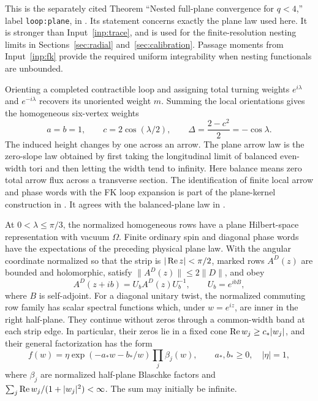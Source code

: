 This is the separately cited Theorem ``Nested full-plane convergence
for $q<4$,'' label \texttt{loop:plane}, in
\cite[Section ``From squares to the free plane law and the
sphere'']{FKCompanion}. Its statement concerns exactly the plane law
used here. It is stronger than Input~\ref{inp:trace}, and is used for
the finite-resolution nesting limits in Sections~\ref{sec:radial}
and~\ref{sec:calibration}. Passage moments from Input~\ref{inp:fk}
provide the required uniform integrability when nesting functionals
are unbounded.

Orienting a completed contractible loop and assigning total turning
weights $e^{i\lambda}$ and $e^{-i\lambda}$ recovers its unoriented
weight $m$. Summing the local orientations gives the homogeneous
six-vertex weights
\[
 a=b=1,\qquad c=2\cos(\lambda/2),\qquad
 \Delta=\frac{2-c^2}{2}=-\cos\lambda.
\]
The induced height changes by one across an arrow. The plane arrow
law is the zero-slope law obtained by first taking the longitudinal
limit of balanced even-width tori and then letting the width tend to
infinity. Here balance means zero total arrow flux across a transverse
section. The identification of finite local arrow and phase words
with the FK loop expansion is part of the plane-kernel construction
in \cite[Section ``Row algebra and the infinite-plane state'']{FKCompanion}.
It agrees with the balanced-plane law in \cite[Theorem~2.2 and
Equation~(18)]{DKLM}.

\begin{standinginput}\label{inp:rows}
At $0<\lambda\le\pi/3$, the normalized homogeneous rows have a plane
Hilbert-space representation with vacuum $\Omega$. Finite ordinary
spin and diagonal phase words have the expectations of the preceding
physical plane law. With the angular coordinate normalized so that
the strip is $|\operatorname{Re} z|<\pi/2$, marked rows $A^D(z)$ are bounded and
holomorphic, satisfy $\|A^D(z)\|\le2\|D\|$, and obey
\[
 A^D(z+ib)=U_bA^D(z)U_b^{-1},\qquad U_b=e^{ibB},
\]
where $B$ is self-adjoint. For a diagonal unitary twist, the normalized
commuting row family has scalar spectral functions which, under
$w=e^{iz}$, are inner in the right half-plane. They continue without
zeros through a common-width band at each strip edge. In particular,
their zeros lie in a fixed cone $\operatorname{Re} w_j\ge c_*|w_j|$, and their
general factorization has the form
\[
 f(w)=\eta\exp(-a_*w-b_*/w)\prod_j\beta_j(w),\qquad
 a_*,b_*\ge0,\quad |\eta|=1,
\]
where $\beta_j$ are normalized half-plane Blaschke factors and
$\sum_j\operatorname{Re} w_j/(1+|w_j|^2)<\infty$. The sum may initially be infinite.
\end{standinginput}

